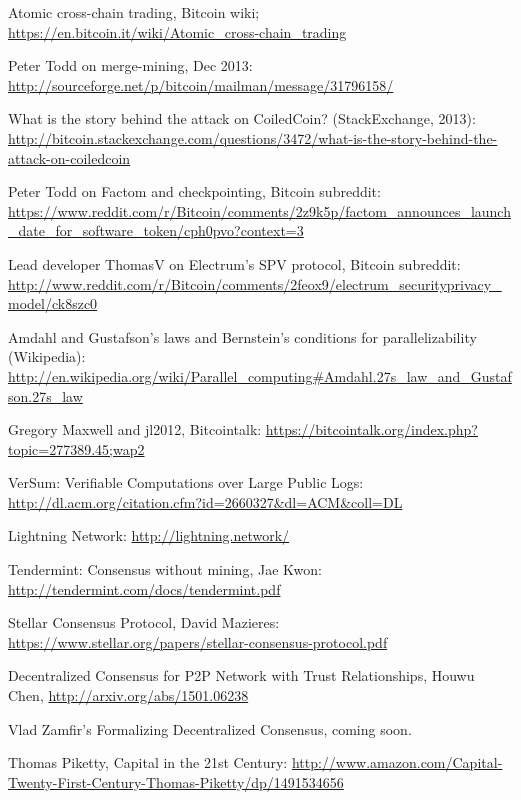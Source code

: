 \documentclass[11pt,a4paper]{article}
\theoremstyle{plain}
\theoremstyle{definition}
\theoremstyle{remark}
\begin{document}
\begin{thebibliography}{40}

    Atomic cross-chain trading, Bitcoin wiki; \url{https://en.bitcoin.it/wiki/Atomic_cross-chain_trading}

    Peter Todd on merge-mining, Dec 2013: \url{http://sourceforge.net/p/bitcoin/mailman/message/31796158/}

    What is the story behind the attack on CoiledCoin? (StackExchange, 2013): \url{http://bitcoin.stackexchange.com/questions/3472/what-is-the-story-behind-the-attack-on-coiledcoin}

    Peter Todd on Factom and checkpointing, Bitcoin subreddit: \url{https://www.reddit.com/r/Bitcoin/comments/2z9k5p/factom_announces_launch_date_for_software_token/cph0pvo?context=3}

    Lead developer ThomasV on Electrum's SPV protocol, Bitcoin subreddit: \url{http://www.reddit.com/r/Bitcoin/comments/2feox9/electrum_securityprivacy_model/ck8szc0}

    Amdahl and Gustafson's laws and Bernstein's conditions for parallelizability (Wikipedia): \url{http://en.wikipedia.org/wiki/Parallel_computing#Amdahl.27s_law_and_Gustafson.27s_law}

    Gregory Maxwell and jl2012, Bitcointalk: \url{https://bitcointalk.org/index.php?topic=277389.45;wap2}

    VerSum: Verifiable Computations over Large Public Logs: \url{http://dl.acm.org/citation.cfm?id=2660327&dl=ACM&coll=DL}

    Lightning Network: \url{http://lightning.network/}

    Tendermint: Consensus without mining, Jae Kwon: \url{http://tendermint.com/docs/tendermint.pdf}

    Stellar Consensus Protocol, David Mazieres: \url{https://www.stellar.org/papers/stellar-consensus-protocol.pdf}

    Decentralized Consensus for P2P Network with Trust Relationships, Houwu Chen, \url{http://arxiv.org/abs/1501.06238}

    Vlad Zamfir's Formalizing Decentralized Consensus, coming soon.

    Thomas Piketty, Capital in the 21st Century: \url{http://www.amazon.com/Capital-Twenty-First-Century-Thomas-Piketty/dp/1491534656}


\end{thebibliography}
\end{document}
